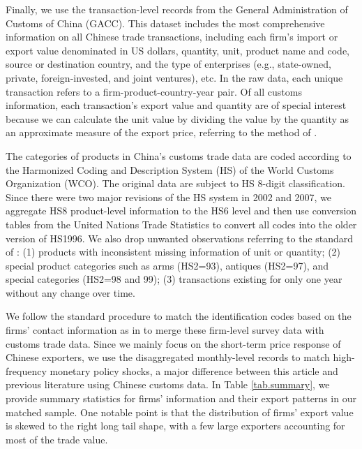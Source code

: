 Finally, we use the transaction-level records from the General Administration of Customs of China (GACC). This dataset includes the most comprehensive information on all Chinese trade transactions, including each firm's import or export value denominated in US dollars, quantity, unit, product name and code, source or destination country, and the type of enterprises (e.g., state-owned, private, foreign-invested, and joint ventures), etc. In the raw data, each unique transaction refers to a firm-product-country-year pair. Of all customs information, each transaction's export value and quantity are of special interest because we can calculate the unit value by dividing the value by the quantity as an approximate measure of the export price, referring to the method of \cite{deloecker2012markups}. 

The categories of products in China's customs trade data are coded according to the Harmonized Coding and Description System (HS) of the World Customs Organization (WCO). The original data are subject to HS 8-digit classification. Since there were two major revisions of the HS system in 2002 and 2007, we aggregate HS8 product-level information to the HS6 level and then use conversion tables from the United Nations Trade Statistics to convert all codes into the older version of HS1996. We also drop unwanted observations referring to the standard of \cite{li2015exchange}: (1) products with inconsistent missing information of unit or quantity; (2) special product categories such as arms (HS2=93), antiques (HS2=97), and special categories (HS2=98 and 99); (3) transactions existing for only one year without any change over time.

We follow the standard procedure to match the identification codes based on the firms' contact information as in \cite{feenstra2014exports} to merge these firm-level survey data with customs trade data. Since we mainly focus on the short-term price response of Chinese exporters, we use the disaggregated monthly-level records to match high-frequency monetary policy shocks, a major difference between this article and previous literature using Chinese customs data. In Table \ref{tab.summary}, we provide summary statistics for firms' information and their export patterns in our matched sample. One notable point is that the distribution of firms' export value is skewed to the right long tail shape, with a few large exporters accounting for most of the trade value.

